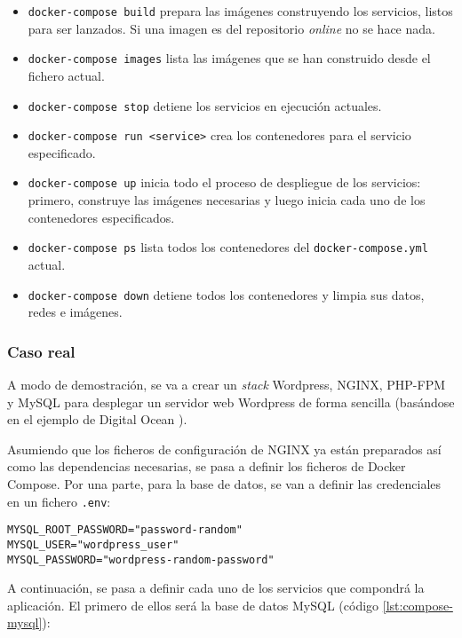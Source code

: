 \begin{itemize}
  \item \lstinline[style=bash]!docker-compose build! prepara las imágenes 
        construyendo los servicios, listos para ser lanzados. Si una imagen
        es del repositorio \textit{online} no se hace nada.
  \item \lstinline[style=bash]!docker-compose images! lista las imágenes que
        se han construido desde el fichero actual.
  \item \lstinline[style=bash]!docker-compose stop! detiene los servicios en
        ejecución actuales.
  \item \lstinline[style=bash]!docker-compose run <service>! crea los contenedores
        para el servicio especificado.
  \item \lstinline[style=bash]!docker-compose up! inicia todo el proceso de despliegue
        de los servicios: primero, construye las imágenes necesarias y luego
        inicia cada uno de los contenedores especificados.
  \item \lstinline[style=bash]!docker-compose ps! lista todos los contenedores del
        \texttt{docker-compose.yml} actual.
  \item \lstinline[style=bash]!docker-compose down! detiene todos los contenedores
        y limpia sus datos, redes e imágenes.
\end{itemize}

\subsubsection*{Caso real}
A modo de demostración, se va a crear un \textit{stack} Wordpress, NGINX, PHP-FPM
y MySQL para desplegar un servidor web Wordpress de forma sencilla (basándose en
el ejemplo de Digital Ocean \cite{ComoInstalarWordPress}).

Asumiendo que los ficheros de configuración de NGINX ya están preparados así
como las dependencias necesarias, se pasa a definir los ficheros de Docker
Compose. Por una parte, para la base de datos, se van a definir las
credenciales en un fichero \texttt{.env}:

\begin{lstlisting}[style=bash, caption={}]
MYSQL_ROOT_PASSWORD="password-random"
MYSQL_USER="wordpress_user"
MYSQL_PASSWORD="wordpress-random-password"
\end{lstlisting}

A continuación, se pasa a definir cada uno de los servicios que compondrá la
aplicación. El primero de ellos será la base de datos MySQL (código \ref{lst:compose-mysql}):

